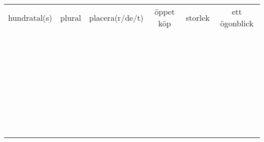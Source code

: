 \begin{center}
\begin{adjustwidth}{-2cm}{}
\begin{tabular}{|c c c c c c|}
            hundratal(s) & plural & placera(r/de/t) & öppet köp & storlek & ett ögonblick \\
             &  &  &  &  &  \\
             &  &  &  &  &  \\
             &  &  &  &  &  \\
             &  &  &  &  &  \\
             &  &  &  &  &  \\
             &  &  &  &  &  \\
             &  &  &  &  &  \\
             &  &  &  &  &  \\
             &  &  &  &  &  \\
             &  &  &  &  &  \\
             &  &  &  &  &  \\
             &  &  &  &  &  \\
             &  &  &  &  &  \\
             &  &  &  &  &  \\
             &  &  &  &  &  \\
             &  &  &  &  &  \\
             &  &  &  &  &  \\
             &  &  &  &  &  \\
             &  &  &  &  &  \\
             &  &  &  &  &  \\
             &  &  &  &  &  \\
             &  &  &  &  &  \\
             &  &  &  &  &  \\
             &  &  &  &  &  \\
             &  &  &  &  &  \\
             &  &  &  &  &  \\
             &  &  &  &  &  \\
             &  &  &  &  &  \\
             &  &  &  &  &  \\
             &  &  &  &  &  \\
             &  &  &  &  &  \\
             &  &  &  &  &  \\
             &  &  &  &  &  \\
             &  &  &  &  &  \\
             &  &  &  &  &  \\

\end{tabular}
\end{adjustwidth}
\end{center}
